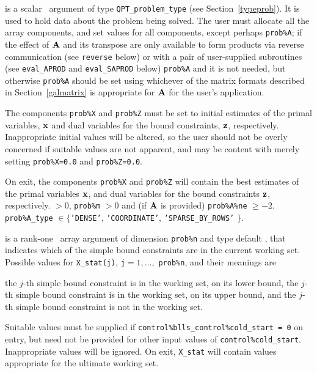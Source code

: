 \documentclass{galahad}
\begin{document}
\vspace*{-3mm}
\begin{description}
 is a scalar \intentinout\ argument of type
{\tt QPT\_problem\_type}
(see Section~\ref{typeprob}).
It is used to hold data about the problem being solved.
The user must allocate all the array components,
and set values for all components, except perhaps {\tt prob\%A};
if the effect of ${\mathbf{A}}$ and its transpose are only available to form products
via reverse communication (see {\tt reverse} below)
or with a pair of user-supplied subroutines (see {\tt eval\_APROD}
and {\tt eval\_SAPROD} below)
{\tt prob\%A} and it is not needed, but otherwise {\tt prob\%A} should be
set using whichever
of the matrix formats described in Section~\ref{galmatrix}
is appropriate for ${\mathbf{A}}$ for the user's application.

The components {\tt prob\%X} and {\tt prob\%Z}
must be set to initial estimates of the primal variables,
${\mathbf{x}}$ and dual variables for the bound constraints, ${\mathbf{z}}$, respectively.
Inappropriate initial values will be altered, so the user should
not be overly concerned if suitable values are not apparent, and may be
content with merely setting {\tt prob\%X=0.0}
and {\tt prob\%Z=0.0}.

On exit, the components {\tt prob\%X} and {\tt prob\%Z}
will contain the best estimates of the primal variables ${\mathbf{x}}$,
and dual variables for the bound constraints ${\mathbf{z}}$, respectively.
 $> 0$, {\tt prob\%m} $> 0$
              and (if ${\mathbf{A}}$ is provided) {\tt prob\%A\%ne} $\geq -2$.
{\tt prob\%A\_type} $\in \{${\tt 'DENSE'},
 {\tt 'COORDINATE'}, {\tt 'SPARSE\_BY\_\-ROWS'} $\}$.

 is a rank-one \intentinout\ array argument of dimension {\tt prob\%n}
and type default \integer, that indicates which of the simple bound
constraints are in the current working set. Possible values for
{\tt X\_stat(j)}, {\tt j}$=1, \ldots ,$ {\tt prob\%n}, and their meanings are
\begin{description}
 the $j$-th simple bound constraint
is in the working set, on its lower bound,
 the $j$-th simple bound constraint
is in the working set, on its upper bound, and
  the $j$-th simple bound constraint is not in the working set.
\end{description}
Suitable values must be supplied if
{\tt control\%blls\_control\%cold\_start = 0} on entry,
but need not be provided for other input values of {\tt control\%cold\_start}.
Inappropriate values will be ignored.
On exit, {\tt X\_stat} will contain values appropriate for the ultimate
working set.


\end{description}
\end{document}
